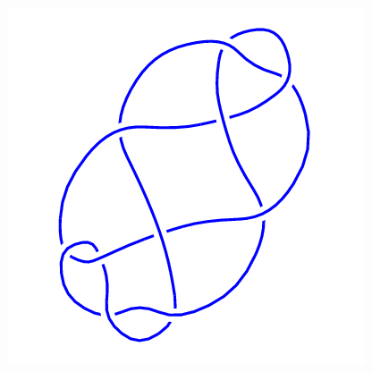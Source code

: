 \begin{figure}[H]
\begin{minipage}[b]{.18\linewidth}
    \end{minipage}
    \begin{minipage}[b]{.18\linewidth}
        \centering
        \includegraphics[width=\linewidth]{../data/10_41.png}
    \end{minipage}
\end{figure}
